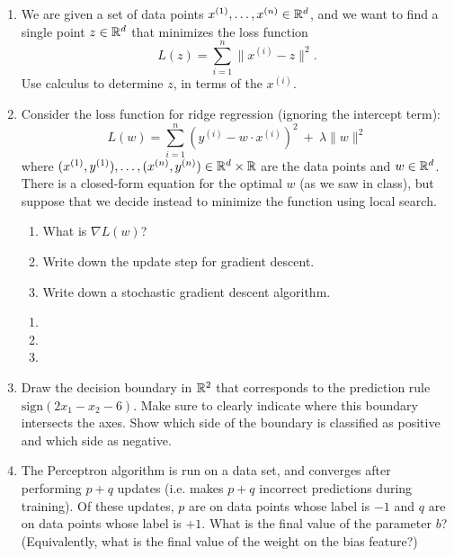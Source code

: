\documentclass[10pt]{report}
\begin{document}
\begin{enumerate}
\item We are given a set of data points $x^{(1)}, \ldots, x^{(n)} \in {\mathbb R}^d$, and we want to find a single point $z \in {\mathbb R}^d$ that minimizes the loss function
$$ L(z) = \sum_{i=1}^n \|x^{(i)} - z \|^2 .$$
Use calculus to determine $z$, in terms of the $x^{(i)}$.
\begin{solution}

\end{solution}

\item Consider the loss function for ridge regression (ignoring the intercept term):
$$ L(w) = \sum_{i=1}^n (y^{(i)} - w \cdot x^{(i)})^2 \ + \ \lambda \|w\|^2 $$
where $(x^{(1)}, y^{(1)}), \ldots, (x^{(n)}, y^{(n)}) \in {\mathbb R}^d \times {\mathbb R}$ are the data points and $w \in {\mathbb R}^d$. There is a closed-form equation for the optimal $w$ (as we saw in class), but suppose that we decide instead to minimize the function using local search.
\begin{enumerate}
\item What is $\nabla L(w)$?
\item Write down the update step for gradient descent.
\item Write down a stochastic gradient descent algorithm.
\end{enumerate}
\begin{solution}
  \begin{enumerate}
    \item
    \item
    \item
  \end{enumerate}
\end{solution}

\item Draw the decision boundary in ${\mathbb R}^2$ that corresponds to the prediction rule $\mbox{sign}(2x_1 - x_2 - 6)$. Make sure to clearly indicate where this boundary intersects the axes. Show which side of the boundary is classified as positive and which side as negative.
\begin{solution}

\end{solution}

\item The Perceptron algorithm is run on a data set, and converges after performing $p+q$ updates (i.e. makes $p+q$ incorrect predictions during training). Of these updates, $p$ are on data points whose label is $-1$ and $q$ are on data points whose label is $+1$. What is the final value of the parameter $b$? (Equivalently, what is the final value of the weight on the bias feature?)
\begin{solution}


\end{solution}
\end{enumerate}
\end{document}
